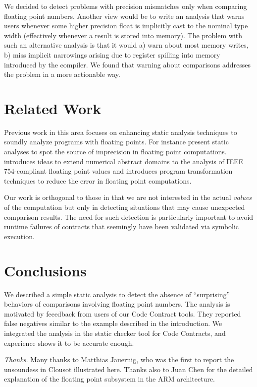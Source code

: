 \documentclass{entcs}
\begin{document}
We decided to detect problems with precision mismatches only when
comparing floating point numbers. Another view would be to write an
analysis that warns users whenever some higher precision float is
implicitly cast to the nominal type width (effectively whenever a
result is stored into memory). The problem with such an alternative
analysis is that it would a) warn about most memory writes, b) miss
implicit narrowings arising due to register spilling into memory
introduced by the compiler. We found that warning about comparisons
addresses the problem in a more actionable way.

\section{Related Work}
Previous work in this area focuses on enhancing static analysis
techniques to soundly analyze programs with floating points.  For
instance \cite{GoubaultPutot11,Martel02,Martel02b} present static
analyses to spot the source of imprecision in floating point
computations. \cite{Mine04} introduces ideas to extend numerical
abstract domains to the analysis of IEEE 754-compliant floating point
values and \cite{Martel09} introduces program transformation
techniques to reduce the error in floating point computations.

Our work is orthogonal to those in that we are not interested in the
actual \emph{values} of the computation but only in detecting
situations that may cause unexpected comparison results. The need for
such detection is particularly important to avoid runtime failures of
contracts that seemingly have been validated via symbolic execution.

\section{Conclusions}
We described a simple static analysis to detect the absence of
``surprising'' behaviors of comparisons involving floating point
numbers.  The analysis is motivated by feeedback from users of our
Code Contract tools. They reported false negatives similar to the example
described in the introduction.  We integrated the analysis in the
static checker tool for Code Contracts, and experience shows it to be accurate enough.


\emph{Thanks.} Many thanks to Matthias Jauernig, who was the first to
report the unsoundess in Clousot illustrated here. Thanks also to Juan
Chen for the detailed explanation of the floating point subsystem in
the ARM architecture.



\end{document}

